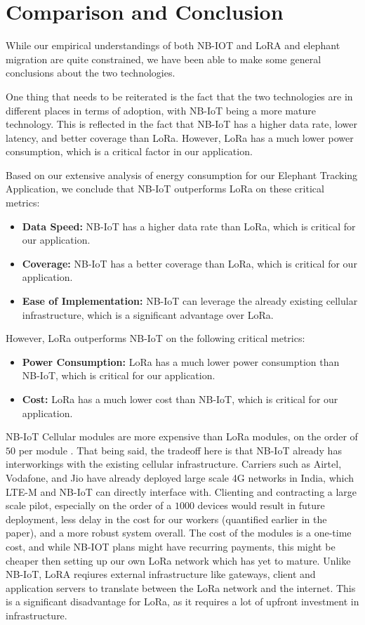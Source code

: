 \section{Comparison and Conclusion}
\label{sec:conclusion}

While our empirical understandings of both NB-IOT and LoRA and elephant migration are quite constrained, we have been able to make some general conclusions about the two technologies. 

One thing that needs to be reiterated is the fact that the two technologies are in different places in terms of adoption, with NB-IoT being a more mature technology. This is reflected in the fact that NB-IoT has a higher data rate, lower latency, and better coverage than LoRa. However, LoRa has a much lower power consumption, which is a critical factor in our application.

Based on our extensive analysis of energy consumption for our Elephant Tracking Application, we conclude that NB-IoT outperforms LoRa on these critical metrics:
\begin{itemize}
    \item \textbf{Data Speed: } NB-IoT has a higher data rate than LoRa, which is critical for our application.
    \item \textbf{Coverage: } NB-IoT has a better coverage than LoRa, which is critical for our application.
    \item \textbf{Ease of Implementation: } NB-IoT can leverage the already existing cellular infrastructure, which is a significant advantage over LoRa. 
\end{itemize}

However, LoRa outperforms NB-IoT on the following critical metrics:
\begin{itemize}
    \item \textbf{Power Consumption: } LoRa has a much lower power consumption than NB-IoT, which is critical for our application.
    \item \textbf{Cost: } LoRa has a much lower cost than NB-IoT, which is critical for our application.
\end{itemize}

NB-IoT Cellular modules are more expensive than LoRa modules, on the order of $50$ per module
\cite{nbprod}. That being said, the tradeoff here is that NB-IoT already has interworkings with the existing cellular infrastructure. Carriers such as Airtel, Vodafone, and Jio have already deployed large scale 4G networks in India, which LTE-M and NB-IoT can directly interface with. Clienting and contracting a large scale pilot, especially on the order of a $1000$ devices would result in future deployment, less delay in the cost for our workers (quantified earlier in the paper), and a more robust system overall.  The cost of the modules is a one-time cost, and while NB-IOT plans might have recurring payments, this might be cheaper then setting up our own LoRa network which has yet to mature. Unlike NB-IoT, LoRA reqiures external infrastructure like gateways, client and application servers to translate between the LoRa network and the internet. This is a significant disadvantage for LoRa, as it requires a lot of upfront investment in infrastructure.

